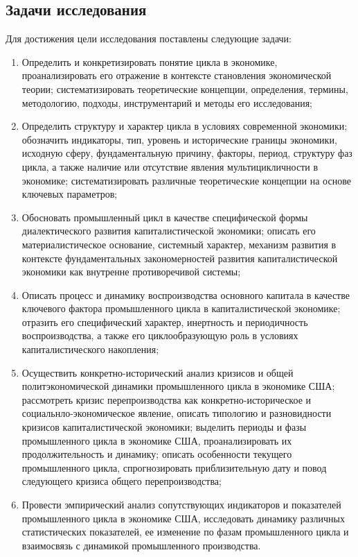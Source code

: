 \subsection*{Задачи исследования}
Для достижения цели исследования поставлены следующие задачи:
\begin{enumerate}
    \item Определить и конкретизировать понятие цикла в экономике, проанализировать его отражение в контексте становления экономической теории; систематизировать теоретические концепции, определения, термины, методологию, подходы, инструментарий и методы его исследования;
    \item Определить структуру и характер цикла в условиях современной экономики; обозначить индикаторы, тип, уровень и исторические границы экономики, исходную сферу, фундаментальную причину, факторы, период, структуру фаз цикла, а также наличие или отсутствие явления мультицикличности в экономике; систематизировать различные теоретические концепции на основе ключевых параметров;
    \item Обосновать промышленный цикл в качестве специфической формы диалектического развития капиталистической экономики; описать его материалистическое основание, системный характер, механизм развития в контексте фундаментальных закономерностей развития капиталистической экономики как внутренне противоречивой системы;
    \item Описать процесс и динамику воспроизводства основного капитала в качестве ключевого фактора промышленного цикла в капиталистической экономике; отразить его специфический характер, инертность и периодичность воспроизводства, а также его циклообразующую роль в условиях капиталистического накопления;
    \item Осуществить конкретно-исторический анализ кризисов и общей политэкономической динамики промышленного цикла в экономике США; рассмотреть кризис перепроизводства как конкретно-историческое и социальнло-экономическое явление, описать типологию и разновидности кризисов капиталистической экономики; выделить периоды и фазы промышленного цикла в экономике США, проанализировать их продолжительность и динамику; описать особенности текущего промышленного цикла, спрогнозировать приблизительную дату и повод следующего кризиса общего перепроизводства;
    \item Провести эмпирический анализ сопутствующих индикаторов и показателей промышленного цикла в экономике США, исследовать динамику различных статистических показателей, ее изменение по фазам промышленного цикла и взаимосвязь с динамикой промышленного производства.
\end{enumerate}

